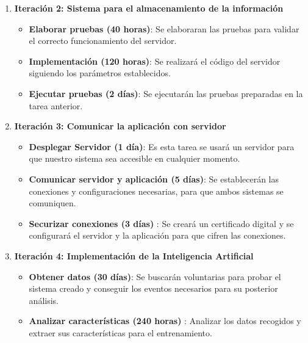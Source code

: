 \begin{enumerate}
    \item \textbf{Iteración 2:  Sistema para el almacenamiento de la información}
    \begin{itemize}
        \item \textbf{Elaborar pruebas (40 horas)}: Se elaboraran las pruebas para validar el correcto funcionamiento del servidor.
        
        \item \textbf{Implementación (120 horas)}: Se realizará el código del servidor siguiendo los parámetros establecidos.
        
        \item \textbf{Ejecutar pruebas (2 días)}: Se ejecutarán las pruebas preparadas en la tarea anterior.
    \end{itemize}
    
    \item \textbf{Iteración 3: Comunicar la aplicación con servidor}
    \begin{itemize}
        
        \item \textbf{Desplegar Servidor (1 día)}: Es esta tarea se usará un servidor para que nuestro sistema sea accesible en cualquier momento.
        
        \item \textbf{Comunicar servidor y aplicación (5 días)}: Se establecerán las conexiones y configuraciones necesarias, para que ambos sistemas se comuniquen.
        
        \item \textbf{Securizar conexiones (3 días) }: Se creará un certificado digital y se configurará el servidor y la aplicación para que cifren las conexiones. 
        
    \end{itemize}
    
    \item \textbf{Iteración 4: Implementación de la Inteligencia Artificial}
    \begin{itemize}
    
    
        \item \textbf{Obtener datos (30 días)}: Se buscarán voluntarias para probar el sistema creado y conseguir los eventos necesarios para su posterior análisis.
        
        \item \textbf{Analizar características (240 horas)} : Analizar los datos recogidos y extraer sus características para el entrenamiento.
        

\end{itemize}
\end{enumerate}
